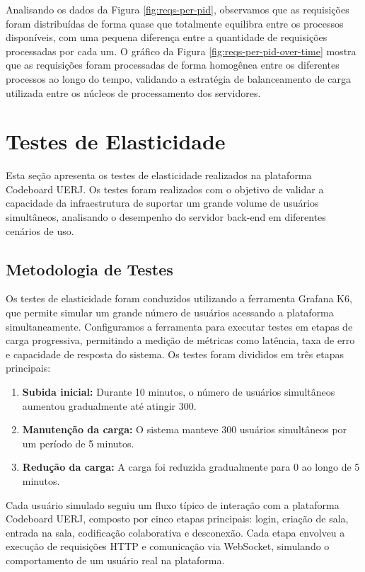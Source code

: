 Analisando os dados da Figura \ref{fig:reqs-per-pid}, observamos que as requisições foram distribuídas de forma quase que totalmente equilibra entre os processos disponíveis, com uma pequena diferença entre a quantidade de requisições processadas por cada um. O gráfico da Figura \ref{fig:reqs-per-pid-over-time} mostra que as requisições foram processadas de forma homogênea entre os diferentes processos ao longo do tempo, validando a estratégia de balanceamento de carga utilizada entre os núcleos de processamento dos servidores.

\section{Testes de Elasticidade}

Esta seção apresenta os testes de elasticidade realizados na plataforma Codeboard UERJ. Os testes foram realizados com o objetivo de validar a capacidade da infraestrutura de suportar um grande volume de usuários simultâneos, analisando o desempenho do servidor back-end em diferentes cenários de uso.


\subsection{Metodologia de Testes}

Os testes de elasticidade foram conduzidos utilizando a ferramenta Grafana K6, que permite simular um grande número de usuários acessando a plataforma simultaneamente. Configuramos a ferramenta para executar testes em etapas de carga progressiva, permitindo a medição de métricas como latência, taxa de erro e capacidade de resposta do sistema. Os testes foram divididos em três etapas principais:

\begin{enumerate}
    \item \textbf{Subida inicial:} Durante 10 minutos, o número de usuários simultâneos aumentou gradualmente até atingir 300.
    \item \textbf{Manutenção da carga:} O sistema manteve 300 usuários simultâneos por um período de 5 minutos.
    \item \textbf{Redução da carga:} A carga foi reduzida gradualmente para 0 ao longo de 5 minutos.
\end{enumerate}

Cada usuário simulado seguiu um fluxo típico de interação com a plataforma Codeboard UERJ, composto por cinco etapas principais: login, criação de sala, entrada na sala, codificação colaborativa e desconexão. Cada etapa envolveu a execução de requisições HTTP e comunicação via WebSocket, simulando o comportamento de um usuário real na plataforma.

